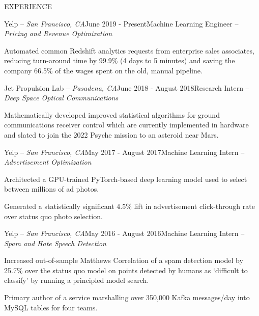 \documentclass{resume} %
\begin{document}
 

\vspace{-1em}
\begin{rSection}{EXPERIENCE}

\begin{rSubsection}{Yelp -- {\it San Francisco, CA}}{June 2019 - Present}{Machine Learning Engineer -- {\sl Pricing and Revenue Optimization}}

\item Automated common Redshift analytics requests from enterprise sales associates, reducing turn-around time by 99.9\% (4 days to 5 minutes) and saving the company 66.5\% of the wages spent on the old, manual pipeline.
\end{rSubsection}

\begin{rSubsection}{Jet Propulsion Lab -- {\it Pasadena, CA}}{June 2018 - August 2018}{Research Intern -- {\sl Deep Space Optical Communications}}

\item Mathematically developed improved statistical algorithms for ground communications receiver control which are currently implemented in hardware and slated to join the 2022 Psyche mission to an asteroid near Mars.
\end{rSubsection}

\begin{rSubsection}{Yelp -- {\it San Francisco, CA}}{May 2017 - August 2017}{Machine Learning Intern -- {\sl Advertisement Optimization}}

\item Architected a GPU-trained PyTorch-based deep learning model used to select between millions of ad photos.
\item Generated a statistically significant 4.5\% lift in advertisement click-through rate over status quo photo selection.
\end{rSubsection}

\begin{rSubsection}{Yelp -- {\it San Francisco, CA}}{May 2016 - August 2016}{Machine Learning Intern -- {\sl Spam and Hate Speech Detection}}

\item Increased out-of-sample Matthews Correlation of a spam detection model by 25.7\% over the status quo model on points detected by humans as `difficult to classify' by running a principled model search.
\item Primary author of a service marshalling over 350,000 Kafka messages/day into MySQL tables for four teams.
\end{rSubsection}

\end{rSection}
\end{document}
